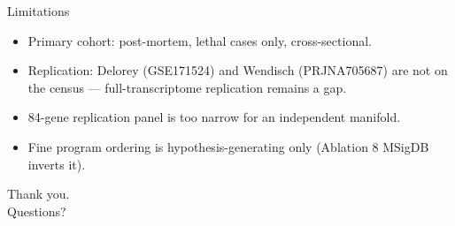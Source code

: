 \documentclass[aspectratio=169]{beamer}
\begin{document}
\begin{frame}{Limitations}
\begin{itemize}
  \item Primary cohort: post-mortem, lethal cases only, cross-sectional.
  \item Replication: Delorey (GSE171524) and Wendisch (PRJNA705687) are
        not on the census --- full-transcriptome replication remains a gap.
  \item 84-gene replication panel is too narrow for an independent manifold.
  \item Fine program ordering is hypothesis-generating only
        (Ablation 8 MSigDB inverts it).
\end{itemize}
\end{frame}

\begin{frame}[standout]
Thank you. \\ Questions?
\end{frame}
\end{document}
